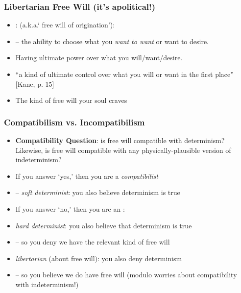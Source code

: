 \begin{frame}
\frametitle{Libertarian Free Will (it's apolitical!)}

\begin{itemize}[<+->]

\item {}: (a.k.a.` free will of origination'): 
\item[] -- the ability to choose what you \textit{want to want} or want to desire. 
\item Having ultimate power over what you will/want/desire. %
\item ``a kind of ultimate control over what you will or want in the first place'' [Kane, p. 15]

\item The kind of free will your soul craves 


\end{itemize}
\end{frame}

\begin{frame}
\frametitle{Compatibilism vs. Incompatibilism}

\begin{itemize}[<+->]

\item \textbf{Compatibility Question}: is free will compatible with determinism? Likewise, is free will compatible with any physically-plausible version of indeterminism?

\item If you answer `yes,' then you are a \emph{compatibilist}
\item[] -- \textit{soft determinist}: you also believe determinism is true 

\item If you answer `no,' then you are an : 

\item \textit{hard determinist}: you also believe that determinism is true
\item[] -- so you deny we have the relevant kind of free will

\item \textit{libertarian} (about free will): you also deny determinism
\item[] -- so you believe we do have free will (modulo worries about compatibility with indeterminism!)

\end{itemize}
\end{frame}

